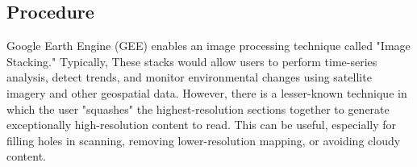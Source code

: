 \documentclass{article}
\begin{document}



\subsection{Procedure}
\label{procedure}

Google Earth Engine (GEE) enables an image processing technique called "Image Stacking." Typically, These stacks would allow users to perform time-series analysis, detect trends, and monitor environmental changes using satellite imagery and other geospatial data. However, there is a lesser-known technique in which the user "squashes" the highest-resolution sections together to generate exceptionally high-resolution content to read. This can be useful, especially for filling holes in scanning, removing lower-resolution mapping, or avoiding cloudy content. 
\end{document}
